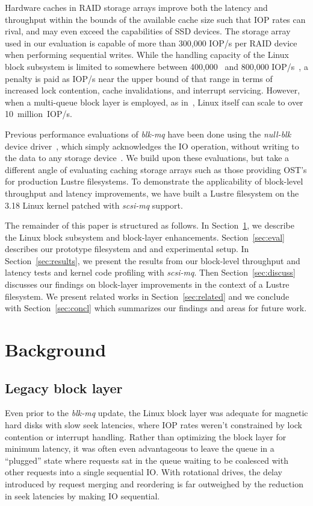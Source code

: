 \documentclass[conference]{IEEEtran}
\begin{document}
Hardware caches in RAID storage arrays improve both the latency and throughput within the bounds of the available cache size such that IOP rates can rival, and may even exceed the capabilities of SSD devices. The storage array used in our evaluation is capable of more than 300,000 IOP/s per RAID device when performing sequential writes. While the handling capacity of the Linux block subsystem is limited to somewhere between 400,000~\cite{assche15} and 800,000 IOP/s~\cite{bjorling13}, a penalty is paid as IOP/s near the upper bound of that range in terms of increased lock contention, cache invalidations, and interrupt servicing. However, when a multi-queue block layer is employed, as in~\cite{bjorling13}, Linux itself can scale to over 10~million~IOP/s.

Previous performance evaluations of \emph{blk-mq} have been done using the \emph{null-blk} device driver~\cite{assche15, bjorling13}, which simply acknowledges the IO operation, without writing to the data to any storage device~\cite{bjorling13}. We build upon these evaluations, but take a different angle of evaluating caching storage arrays such as those providing OST's for production Lustre filesystems. To demonstrate the applicability of block-level throughput and latency improvements, we have built a Lustre filesystem on the 3.18 Linux kernel patched with \emph{scsi-mq} support.

The remainder of this paper is structured as follows. In Section~\ref{sec:back}, we describe the Linux block subsystem and block-layer enhancements. Section~\ref{sec:eval} describes our prototype filesystem and and experimental setup. In Section~\ref{sec:results}, we present the results from our block-level throughput and latency tests and kernel code profiling with \emph{scsi-mq}. Then Section~\ref{sec:discuss} discusses our findings on block-layer improvements in the context of a Lustre filesystem. We present related works in Section~\ref{sec:related} and we conclude with Section~\ref{sec:concl} which summarizes our findings and areas for future work.

\section{Background}
\label{sec:back}
\subsection{Legacy block layer}

Even prior to the \emph{blk-mq} update, the Linux block layer was adequate for magnetic hard disks with slow seek latencies, where IOP rates weren't constrained by lock contention or interrupt handling. Rather than optimizing the block layer for minimum latency, it was often even advantageous to leave the queue in a ``plugged'' state where requests sat in the queue waiting to be coalesced with other requests into a single sequential IO. With rotational drives, the delay introduced by request merging and reordering is far outweighed by the reduction in seek latencies by making IO sequential.
\end{document}
